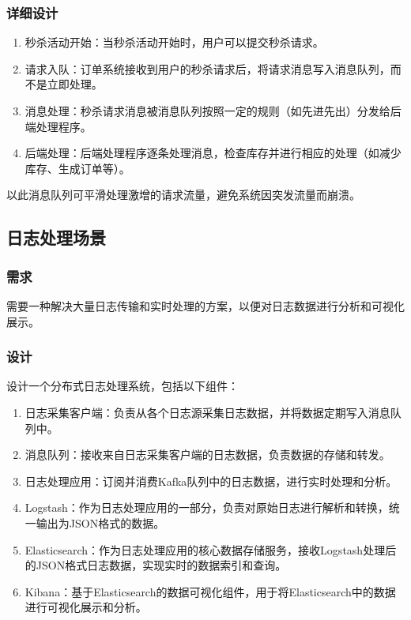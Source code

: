 \documentclass[11pt, a4paper, oneside, fontset=none]{ctexbook}
\begin{document}
\subsubsection{详细设计}
\begin{enumerate}
  \item 秒杀活动开始：当秒杀活动开始时，用户可以提交秒杀请求。
  \item 请求入队：订单系统接收到用户的秒杀请求后，将请求消息写入消息队列，而不是立即处理。
  \item 消息处理：秒杀请求消息被消息队列按照一定的规则（如先进先出）分发给后端处理程序。
  \item 后端处理：后端处理程序逐条处理消息，检查库存并进行相应的处理（如减少库存、生成订单等）。
\end{enumerate}

以此消息队列可平滑处理激增的请求流量，避免系统因突发流量而崩溃。

\subsection{日志处理场景}
\subsubsection{需求}
需要一种解决大量日志传输和实时处理的方案，以便对日志数据进行分析和可视化展示。

\subsubsection{设计}
设计一个分布式日志处理系统，包括以下组件：
\begin{enumerate}
  \item 日志采集客户端：负责从各个日志源采集日志数据，并将数据定期写入消息队列中。
  \item 消息队列：接收来自日志采集客户端的日志数据，负责数据的存储和转发。
  \item 日志处理应用：订阅并消费Kafka队列中的日志数据，进行实时处理和分析。
  \item Logstash：作为日志处理应用的一部分，负责对原始日志进行解析和转换，统一输出为JSON格式的数据。
  \item Elasticsearch：作为日志处理应用的核心数据存储服务，接收Logstash处理后的JSON格式日志数据，实现实时的数据索引和查询。
  \item Kibana：基于Elasticsearch的数据可视化组件，用于将Elasticsearch中的数据进行可视化展示和分析。
\end{enumerate}
\end{document}
